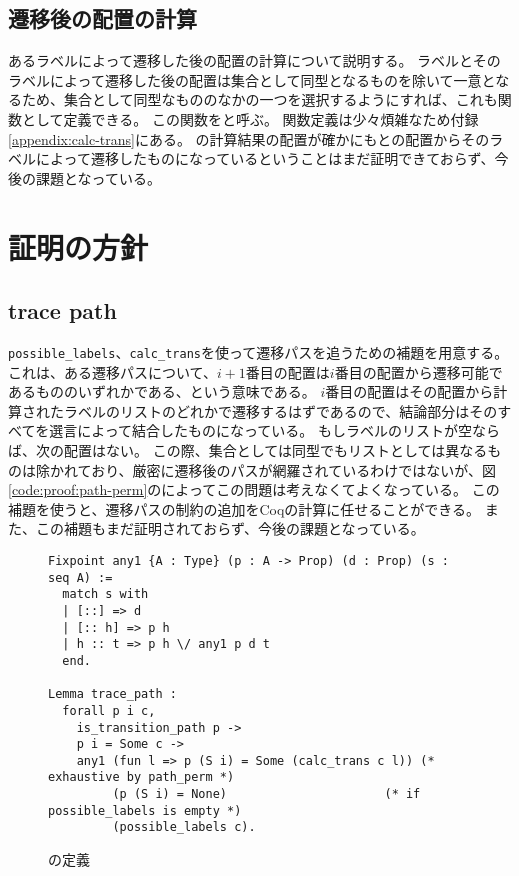 \subsection{遷移後の配置の計算}

あるラベルによって遷移した後の配置の計算について説明する。
ラベルとそのラベルによって遷移した後の配置は集合として同型となるものを除いて一意となるため、集合として同型なもののなかの一つを選択するようにすれば、これも関数として定義できる。
この関数をと呼ぶ。
関数定義は少々煩雑なため付録\ref{appendix:calc-trans}にある。
の計算結果の配置が確かにもとの配置からそのラベルによって遷移したものになっているということはまだ証明できておらず、今後の課題となっている。

\section{証明の方針}

\subsection{trace path}

\lstinline{possible_labels}、\lstinline{calc_trans}を使って遷移パスを追うための補題を用意する。
これは、ある遷移パスについて、$i + 1$番目の配置は$i$番目の配置から遷移可能であるもののいずれかである、という意味である。
$i$番目の配置はその配置から計算されたラベルのリストのどれかで遷移するはずであるので、結論部分はそのすべてを選言によって結合したものになっている。
もしラベルのリストが空ならば、次の配置はない。
この際、集合としては同型でもリストとしては異なるものは除かれており、厳密に遷移後のパスが網羅されているわけではないが、図\ref{code:proof:path-perm}のによってこの問題は考えなくてよくなっている。
この補題を使うと、遷移パスの制約の追加をCoqの計算に任せることができる。
また、この補題もまだ証明されておらず、今後の課題となっている。


\begin{figure}
\begin{lstlisting}
Fixpoint any1 {A : Type} (p : A -> Prop) (d : Prop) (s : seq A) :=
  match s with
  | [::] => d
  | [:: h] => p h
  | h :: t => p h \/ any1 p d t
  end.

Lemma trace_path :
  forall p i c,
    is_transition_path p ->
    p i = Some c ->
    any1 (fun l => p (S i) = Some (calc_trans c l)) (* exhaustive by path_perm *)
         (p (S i) = None)                      (* if possible_labels is empty *)
         (possible_labels c).
\end{lstlisting}
\label{code:proof:trace-path}
\caption{の定義}
\end{figure}

